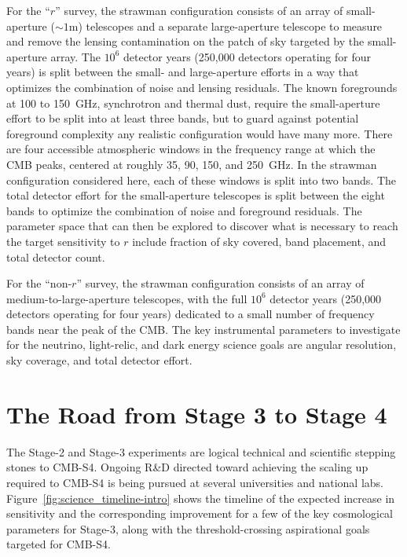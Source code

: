 For the ``$r$'' survey, the strawman configuration consists of an array of small-aperture ($\sim 1$m) telescopes and a separate large-aperture telescope to measure and remove the lensing contamination on the patch of sky targeted by the small-aperture array. The $10^6$ detector years (250,000 detectors operating for four years) is split between the small- and large-aperture efforts in a way that optimizes the combination of noise and lensing residuals. The known foregrounds at 100 to 150~GHz, synchrotron and thermal dust, require the small-aperture effort to be split into at least three bands, but to guard against potential foreground complexity any realistic configuration would have many more. There are four accessible atmospheric windows in the frequency range at which the CMB peaks, centered at roughly 35, 90, 150, and 250~GHz. In the strawman configuration considered here, each of these windows is split into two bands. The total detector effort for the small-aperture telescopes is split between the eight bands to optimize the combination of noise and foreground residuals. The parameter space that can then be explored to discover what is necessary to reach the target sensitivity to $r$ include fraction of sky covered, band placement, and total detector count.

For the ``non-$r$'' survey, the strawman configuration consists of an array of medium-to-large-aperture telescopes,  with the full $10^6$ detector years (250,000 detectors operating for four years) dedicated to a small number of frequency bands near the peak of the CMB. The key instrumental parameters to investigate for the neutrino, light-relic, and dark energy science goals are angular resolution, sky coverage, and total detector effort. 

\section{The Road from Stage 3 to Stage 4}
\label{sec:context}


The Stage-2 and Stage-3 experiments are logical technical and scientific stepping stones to CMB-S4. Ongoing R\&D directed toward achieving the scaling up required to CMB-S4 is being pursued at several universities and national labs. 
Figure~\ref{fig:science_timeline-intro} shows the timeline of the expected increase in sensitivity and the corresponding improvement for a few of the key cosmological parameters for Stage-3, along with the threshold-crossing aspirational goals  targeted for CMB-S4. 

